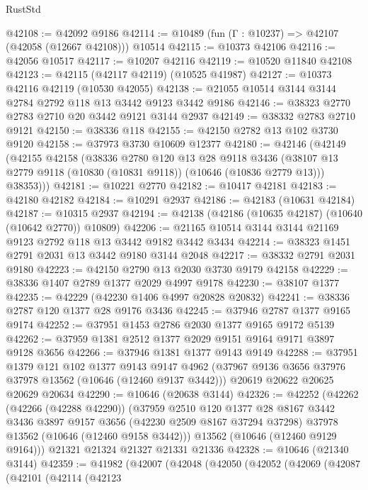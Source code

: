 \begin{lexlean}{RustStd}
\begin{coremodule}
@42108 := @42092 @9186
@42114 := @10489 (fun (Γ : @10237) => @42107 (@42058 (@12667 @42108))) @10514
@42115 := @10373 @42106
@42116 := @42056 @10517
@42117 := @10207 @42116
@42119 := @10520 @11840 @42108
@42123 := @42115 (@42117 @42119) (@10525 @41987)
@42127 := @10373 @42116 @42119 (@10530 @42055)
@42138 := @21055 @10514 @3144 @3144 @2784 @2792 @118 @13 @3442 @9123 @3442 @9186
@42146 := @38323 @2770 @2783 @2710 @20 @3442 @9121 @3144 @2937
@42149 := @38332 @2783 @2710 @9121
@42150 := @38336 @118
@42155 := @42150 @2782 @13 @102 @3730 @9120
@42158 := @37973 @3730 @10609 @12377
@42180 := @42146
    (@42149
      (@42155
        @42158
        (@38336
          @2780
          @120
          @13
          @28
          @9118
          @3436
          (@38107 @13 @2779 @9118 (@10830 (@10831 @9118)) (@10646 (@10836 @2779 @13)))
          @38353)))
@42181 := @10221 @2770
@42182 := @10417 @42181
@42183 := @42180 @42182
@42184 := @10291 @2937
@42186 := @42183 (@10631 @42184)
@42187 := @10315 @2937
@42194 := @42138 (@42186 (@10635 @42187) (@10640 (@10642 @2770)) @10809)
@42206 := @21165 @10514 @3144 @3144 @21169 @9123 @2792 @118 @13 @3442 @9182 @3442 @3434
@42214 := @38323 @1451 @2791 @2031 @13 @3442 @9180 @3144 @2048
@42217 := @38332 @2791 @2031 @9180
@42223 := @42150 @2790 @13 @2030 @3730 @9179 @42158
@42229 := @38336 @1407 @2789 @1377 @2029 @4997 @9178
@42230 := @38107 @1377
@42235 := @42229 (@42230 @1406 @4997 @20828 @20832)
@42241 := @38336 @2787 @120 @1377 @28 @9176 @3436
@42245 := @37946 @2787 @1377 @9165 @9174
@42252 := @37951 @1453 @2786 @2030 @1377 @9165 @9172 @5139
@42262 := @37959 @1381 @2512 @1377 @2029 @9151 @9164 @9171 @3897 @9128 @3656
@42266 := @37946 @1381 @1377 @9143 @9149
@42288 := @37951
    @1379
    @121
    @102
    @1377
    @9143
    @9147
    @4962
    (@37967 @9136 @3656 @37976 @37978 @13562 (@10646 (@12460 @9137 @3442)))
    @20619
    @20622
    @20625
    @20629
    @20634
@42290 := @10646 (@20638 @3144)
@42326 := @42252
    (@42262
      (@42266 (@42288 @42290))
      (@37959
        @2510
        @120
        @1377
        @28
        @8167
        @3442
        @3436
        @3897
        @9157
        @3656
        (@42230 @2509 @8167 @37294 @37298)
        @37978
        @13562
        (@10646 (@12460 @9158 @3442)))
      @13562
      (@10646 (@12460 @9129 @9164)))
    @21321
    @21324
    @21327
    @21331
    @21336
@42328 := @10646 (@21340 @3144)
@42359 := @41982
    (@42007
      (@42048
        (@42050
          (@42052
            (@42069
              (@42087
                (@42101
                  (@42114
                    (@42123

\end{coremodule}
\end{lexlean}
